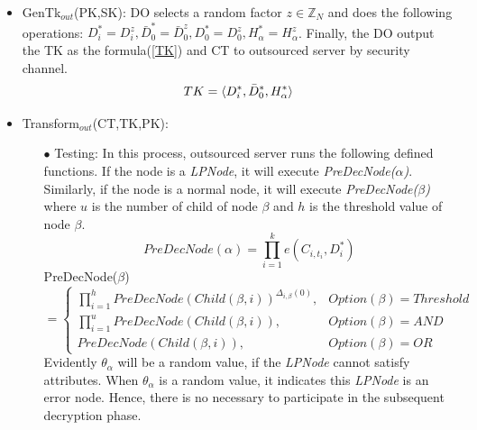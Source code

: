 \documentclass[smallextended]{svjour3}       %
\begin{document}
\begin{itemize}
	\item GenTk$_{out}$(PK,SK): DO selects a random factor $z \in \mathbb{Z}_N$ and does the following operations: $D_i^*=D_i^z,\bar{D}_0^*=\bar{D}_0^z,D_0^*=D_0^z,H_\alpha^*=H_\alpha^z$. 
	Finally, the DO output the TK as the formula(\ref{TK}) and CT to outsourced server by security channel.
	\begin{equation}\label{TK}\\
		TK=\langle D_i^*,\bar{D}_0^*,H^*_\alpha  \rangle
	\end{equation}
	\item Transform$_{out}$(CT,TK,PK):
		\begin{itemize}
			\item [$\bullet$] Testing:
				In this process, outsourced server runs the following defined functions. 
				If the node is a \textit{LPNode}, it will execute \textit{PreDecNode($\alpha$)}. 
				Similarly, if the node is a normal node, it will execute \textit{PreDecNode($\beta$)} where $u$ is the number of child of node $\beta$ and $h$ is the threshold value of node $\beta$.
				\begin{equation}\label{PreDecNodeA}
					PreDecNode(\alpha)=\prod_{i=1}^{k}e(C_{i,t_i},D_i^*)
				\end{equation}
				PreDecNode($\beta$)
				\begin{equation}\label{PreDecNodeB}
					=
					\begin{cases}
					\prod_{i=1}^{h}PreDecNode(Child(\beta,i))^{\Delta_{i,\beta}(0)}, &Option(\beta)=Threshold\\
					\prod_{i=1}^{u}PreDecNode(Child(\beta,i)), &Option(\beta)=AND\\
					PreDecNode(Child(\beta,i)), &Option(\beta)=OR
					\end{cases}
				\end{equation}
				Evidently $\theta_\alpha$ will be a random value, if the \textit{LPNode} cannot satisfy attributes. 
				When $\theta_\alpha$ is a random value, it indicates this \textit{LPNode} is an error node. 
				Hence, there is no necessary to participate in the subsequent decryption phase. 
				

\end{itemize}
\end{itemize}
\end{document}
